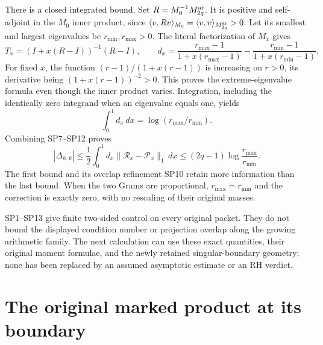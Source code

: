 \documentclass[11pt,a4paper]{article}
\begin{document}
There is a closed integrated bound. Set \(R=M_0^{-1}M^{\rm ar}_{2q}\).
It is positive and self-adjoint in the \(M_0\) inner product, since
\(\langle v,Rv\rangle_{M_0}=\langle v,v\rangle_{M^{\rm ar}_{2q}}>0\).
Let its smallest and largest eigenvalues be \(r_{\min},r_{\max}>0\).
The literal factorization of \(M_x\) gives
\[
 T_x=(I+x(R-I))^{-1}(R-I),\qquad
 d_x=\frac{r_{\max}-1}{1+x(r_{\max}-1)}
           -\frac{r_{\min}-1}{1+x(r_{\min}-1)} .
 \tag{SP11}
\]
For fixed \(x\), the function \((r-1)/(1+x(r-1))\) is increasing
on \(r>0\), its derivative being \((1+x(r-1))^{-2}>0\).
This proves the extreme-eigenvalue formula even though the inner
product varies. Integration, including the identically zero
integrand when an eigenvalue equals one, yields
\[
       \int_0^1d_x\,dx=\log(r_{\max}/r_{\min}).
 \tag{SP12}
\]
Combining SP7--SP12 proves
\[
 \boxed{
 |\Delta_{h,k}|
 \leq\frac12\int_0^1d_x
          \|\mathcal R_x-\mathcal P_x\|_1\,dx
 \leq(2q-1)\log\frac{r_{\max}}{r_{\min}} .}
 \tag{SP13}
\]
The first bound and its overlap refinement SP10 retain more
information than the last bound. When the two Grams are proportional,
\(r_{\max}=r_{\min}\) and the correction is exactly zero, with no
rescaling of their original masses.

SP1--SP13 give finite two-sided control on every original packet.
They do not bound the displayed condition number or projection
overlap along the growing arithmetic family. The next calculation
can use these exact quantities, their original moment formulae,
and the newly retained singular-boundary geometry; none has been
replaced by an assumed asymptotic estimate or an RH verdict.

\clearpage

\begingroup
\renewcommand{\theequation}{BC\arabic{equation}}
\renewcommand{\theHequation}{BC.\arabic{equation}}
\setcounter{equation}{0}
\section*{The original marked product at its boundary}
\end{document}
